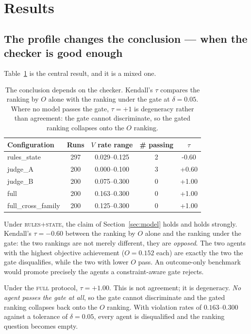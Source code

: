 \documentclass{article}
\begin{document}
\section{Results}
\label{sec:results}

\subsection{The profile changes the conclusion --- when the checker is good enough}

Table~\ref{tab:configs} is the central result, and it is a mixed one.

\begin{table}[t]
\caption{The conclusion depends on the checker. Kendall's $\tau$ compares the ranking by $O$ alone with the ranking under the gate at $\delta=0.05$. Where no model passes the gate, $\tau=+1$ is degeneracy rather than agreement: the gate cannot discriminate, so the gated ranking collapses onto the $O$ ranking.}
\label{tab:configs}
\vskip 0.1in
\begin{center}\begin{small}
\begin{tabular}{lcccc}
\toprule
Configuration & Runs & $V$ rate range & \# passing & $\tau$ \\
\midrule
rules\_state & 297 & 0.029--0.125 & 2 & -0.60 \\
judge\_A & 200 & 0.000--0.100 & 3 & +0.60 \\
judge\_B & 200 & 0.075--0.300 & 0 & +1.00 \\
full & 200 & 0.163--0.300 & 0 & +1.00 \\
full\_cross\_family & 200 & 0.125--0.300 & 0 & +1.00 \\
\bottomrule
\end{tabular}
\end{small}\end{center}
\vskip -0.1in
\end{table}

Under \textsc{rules+state}, the claim of Section~\ref{sec:model} holds and holds strongly. Kendall's $\tau=-0.60$ between the ranking by $O$ alone and the ranking under the gate: the two rankings are not merely different, they are \emph{opposed}. The two agents with the highest objective achievement ($O=0.152$ each) are exactly the two the gate disqualifies, while the two with lower $O$ pass. An outcome-only benchmark would promote precisely the agents a constraint-aware gate rejects.

Under the \textsc{full} protocol, $\tau=+1.00$. This is not agreement; it is degeneracy. \emph{No agent passes the gate at all}, so the gate cannot discriminate and the gated ranking collapses back onto the $O$ ranking. With violation rates of $0.163$--$0.300$ against a tolerance of $\delta=0.05$, every agent is disqualified and the ranking question becomes empty.
\end{document}
